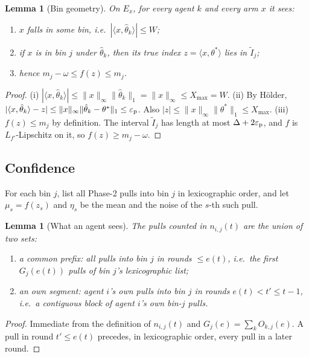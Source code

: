 \documentclass[11pt]{article}
\newtheorem{lemma}[theorem]{Lemma}
\theoremstyle{definition}
\newcommand{\Xmax}{X_{\max}}
\newcommand{\eps}{\varepsilon}
\begin{document}
\begin{lemma}[Bin geometry]\label{lem:geom}
On $E_x$, for every agent $k$ and every arm $x$ it sees:
\begin{enumerate}[nosep,label=(\roman*)]
\item $x$ falls in some bin, i.e.\ $|\langle x,\hat\theta_k\rangle|\le W$;
\item if $x$ is in bin $j$ under $\hat\theta_k$, then its true index $z=\langle x,\theta^*\rangle$ lies in $\tilde I_j$;
\item hence $m_j-\omega\le f(z)\le m_j$.
\end{enumerate}
\end{lemma}
\begin{proof}
(i) $|\langle x,\hat\theta_k\rangle|\le\|x\|_\infty\|\hat\theta_k\|_1=\|x\|_\infty\le\Xmax=W$.
(ii) By H\"older, $|\langle x,\hat\theta_k\rangle-z|\le\|x\|_\infty\|\hat\theta_k-\theta^*\|_1\le\eps_{\rm p}$. Also
$|z|\le\|x\|_\infty\|\theta^*\|_1\le\Xmax$.
(iii) $f(z)\le m_j$ by definition. The interval $\tilde I_j$ has length at most $\Delta+2\eps_{\rm p}$, and $f$ is
$L_{f'}$-Lipschitz on it, so $f(z)\ge m_j-\omega$.
\end{proof}

\subsection{Confidence}

For each bin $j$, list all Phase-2 pulls into bin $j$ in lexicographic order, and let $\mu_s=f(z_s)$ and $\eta_s$ be
the mean and the noise of the $s$-th such pull.

\begin{lemma}[What an agent sees]\label{lem:view}
The pulls counted in $n_{i,j}(t)$ are the union of two sets:
\begin{enumerate}[nosep,label=(\roman*)]
\item a \emph{common prefix}: all pulls into bin $j$ in rounds $\le e(t)$, i.e.\ the first $G_j(e(t))$ pulls of bin $j$'s
lexicographic list;
\item an \emph{own segment}: agent $i$'s own pulls into bin $j$ in rounds $e(t)<t'\le t-1$, i.e.\ a contiguous block of
agent $i$'s own bin-$j$ pulls.
\end{enumerate}
\end{lemma}
\begin{proof}
Immediate from the definition of $n_{i,j}(t)$ and $G_j(e)=\sum_kO_{k,j}(e)$. A pull in round $t'\le e(t)$ precedes,
in lexicographic order, every pull in a later round.
\end{proof}
\end{document}
